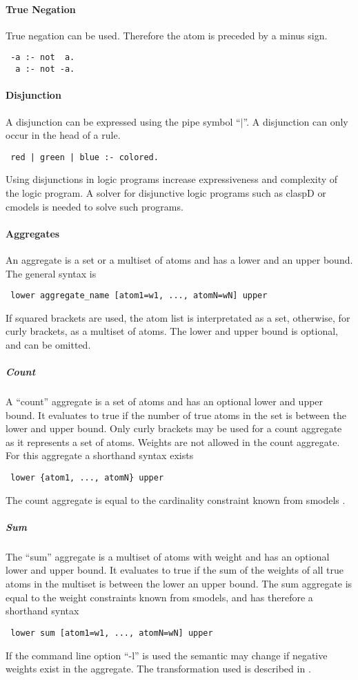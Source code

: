 \documentclass[a4paper,10pt]{article}
\begin{document}
\paragraph{True Negation}
True negation can be used. Therefore the atom is preceded by a minus sign.
\begin{verbatim}
 -a :- not  a.
  a :- not -a. 
\end{verbatim}
\paragraph{Disjunction}
A disjunction can be expressed using the pipe symbol ``$\mid$''.
A disjunction can only occur in the head of a rule.
\begin{verbatim}
 red | green | blue :- colored.
\end{verbatim}
Using disjunctions in logic programs increase expressiveness and complexity of the logic program.
A solver for disjunctive logic programs such as claspD \cite{claspD} or cmodels \cite{cmodels} is needed to solve such programs.

\paragraph{Aggregates}
An aggregate is a set or a multiset of atoms and has a lower and an upper bound.
The general syntax is
\begin{verbatim}
 lower aggregate_name [atom1=w1, ..., atomN=wN] upper
\end{verbatim}
If squared brackets are used, the atom list is interpretated as a set, otherwise, for curly brackets, as a multiset of atoms.
The lower and upper bound is optional, and can be omitted.

\subparagraph{Count}
A ``count'' aggregate is a set of atoms and has an optional lower and upper bound.
It evaluates to true if the number of true atoms in the set is between the lower and upper bound. Only curly brackets may be used for a count aggregate as it represents a set of atoms.
Weights are not allowed in the count aggregate.
For this aggregate a shorthand syntax exists
\begin{verbatim}
 lower {atom1, ..., atomN} upper
\end{verbatim}
The count aggregate is equal to the cardinality constraint known from smodels \cite{smodels}.
\subparagraph{Sum}
The ``sum'' aggregate is a multiset of atoms with weight and has an optional lower and upper bound. It evaluates to true if the sum of the weights of all true atoms in the multiset is between the lower an upper bound.
The sum aggregate is equal to the weight constraints known from smodels, and has therefore a shorthand syntax
\begin{verbatim}
 lower sum [atom1=w1, ..., atomN=wN] upper
\end{verbatim}
If the command line option ``-l'' is used the semantic may change if negative weights exist in the aggregate. The transformation used is described in \cite{lparseManual}.
\end{document}
